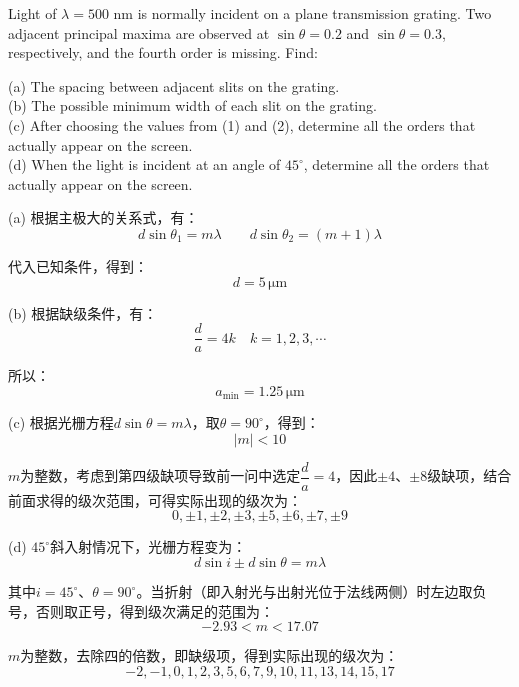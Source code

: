 \begin{solution}[Grating]
    Light of $\lambda = 500$ nm is normally incident on a plane transmission grating. Two adjacent principal maxima are observed at $\sin\theta = 0.2$ and $\sin\theta = 0.3$, respectively, and the fourth order is missing. Find:

    (a) The spacing between adjacent slits on the grating.\\
    (b) The possible minimum width of each slit on the grating.\\
    (c) After choosing the values from (1) and (2), determine all the orders that actually appear on the screen.\\
    (d) When the light is incident at an angle of $45^\circ$, determine all the orders that actually appear on the screen.
    \tcbrule

    (a) 根据主极大的关系式，有：
    \[d\sin\theta_1 = m\lambda\qquad d\sin\theta_2 = (m + 1)\lambda\]

    代入已知条件，得到：
    \[d = 5\,\mathrm{\mu m}\]

    (b) 根据缺级条件，有：
    \[\dfrac{d}{a} = 4k\quad k = 1, 2, 3, \cdots\]

    所以：
    \[a_{\min} = 1.25\,\mathrm{\mu m}\]

    (c) 根据光栅方程$d\sin\theta = m\lambda$，取$\theta = 90^\circ$，得到：
    \[|m| < 10\]

    $m$为整数，考虑到第四级缺项导致前一问中选定$\dfrac{d}{a} = 4$，因此$\pm 4$、$\pm 8$级缺项，结合前面求得的级次范围，可得实际出现的级次为：
    \[0,\pm 1,\pm 2,\pm 3,\pm 5,\pm 6,\pm 7,\pm 9\]

    (d) $45^\circ$斜入射情况下，光栅方程变为：
    \[d\sin i \pm d\sin\theta = m\lambda\]

    其中$i = 45^\circ$、$\theta = 90^\circ$。当折射（即入射光与出射光位于法线两侧）时左边取负号，否则取正号，得到级次满足的范围为：
    \[-2.93 < m < 17.07\]

    $m$为整数，去除四的倍数，即缺级项，得到实际出现的级次为：
    \[-2,-1,0,1,2,3,5,6,7,9,10,11,13,14,15,17\]
\end{solution}

